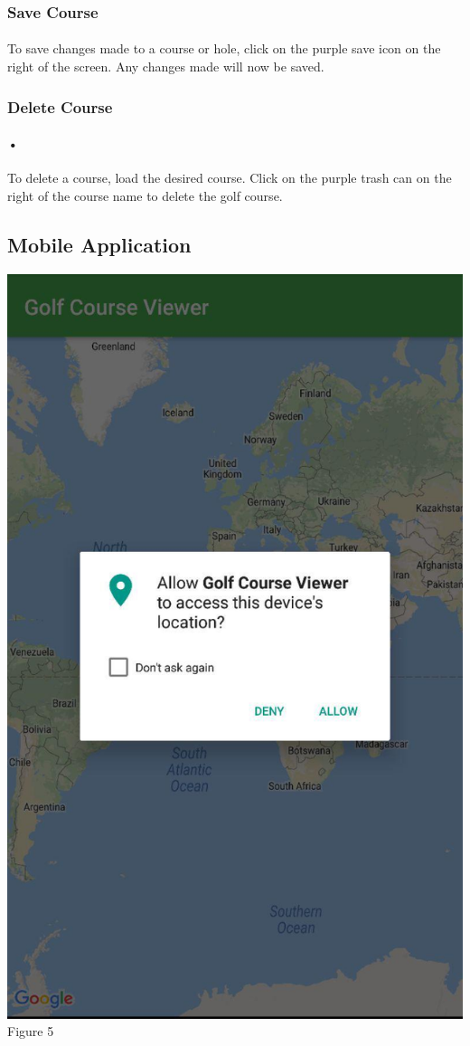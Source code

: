 \documentclass{article}
\begin{document}
    
    \subsubsection{Save Course} 
    \paragraph{}
    To save changes made to a course or hole, click on the purple save icon on the right of the screen. Any changes made will now be saved.
    
    \subsubsection{Delete Course}
	\paragraph{•} 
	To delete a course, load the desired course. Click on the purple trash can on the right of the course name to delete the golf course.


	\subsection{Mobile Application}
	    \includegraphics[scale=0.2]{mobileapp-permissions.jpg}
	    \linebreak
	    Figure 5
\end{document}
